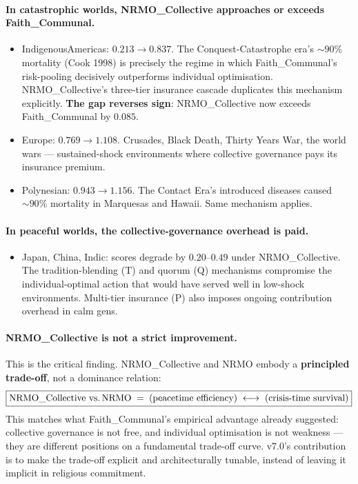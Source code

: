 \paragraph{In catastrophic worlds, NRMO\_Collective approaches or exceeds Faith\_Communal.}
\begin{itemize}
\item IndigenousAmericas: $0.213 \to 0.837$. The Conquest-Catastrophe
  era's $\sim 90\%$ mortality (Cook 1998) is precisely the regime in
  which Faith\_Communal's risk-pooling decisively outperforms
  individual optimisation. NRMO\_Collective's three-tier insurance
  cascade duplicates this mechanism explicitly. \textbf{The gap
  reverses sign}: NRMO\_Collective now exceeds Faith\_Communal by
  $0.085$.
\item Europe: $0.769 \to 1.108$. Crusades, Black Death, Thirty Years
  War, the world wars — sustained-shock environments where collective
  governance pays its insurance premium.
\item Polynesian: $0.943 \to 1.156$. The Contact Era's introduced
  diseases caused $\sim 90\%$ mortality in Marquesas and Hawaii. Same
  mechanism applies.
\end{itemize}

\paragraph{In peaceful worlds, the collective-governance overhead is paid.}
\begin{itemize}
\item Japan, China, Indic: scores degrade by $0.20$--$0.49$ under
  NRMO\_Collective. The tradition-blending (T) and quorum (Q)
  mechanisms compromise the individual-optimal action that would have
  served well in low-shock environments. Multi-tier insurance (P)
  also imposes ongoing contribution overhead in calm gens.
\end{itemize}

\paragraph{NRMO\_Collective is not a strict improvement.}
This is the critical finding. NRMO\_Collective and NRMO embody a
\textbf{principled trade-off}, not a dominance relation:
\begin{equation*}
\boxed{\text{NRMO\_Collective vs.\,NRMO} \;=\;
  \text{(peacetime efficiency)} \;\longleftrightarrow\;
  \text{(crisis-time survival)}}
\end{equation*}
This matches what Faith\_Communal's empirical advantage already
suggested: collective governance is not free, and individual
optimisation is not weakness — they are different positions on a
fundamental trade-off curve. v7.0's contribution is to make the
trade-off explicit and architecturally tunable, instead of leaving
it implicit in religious commitment.


